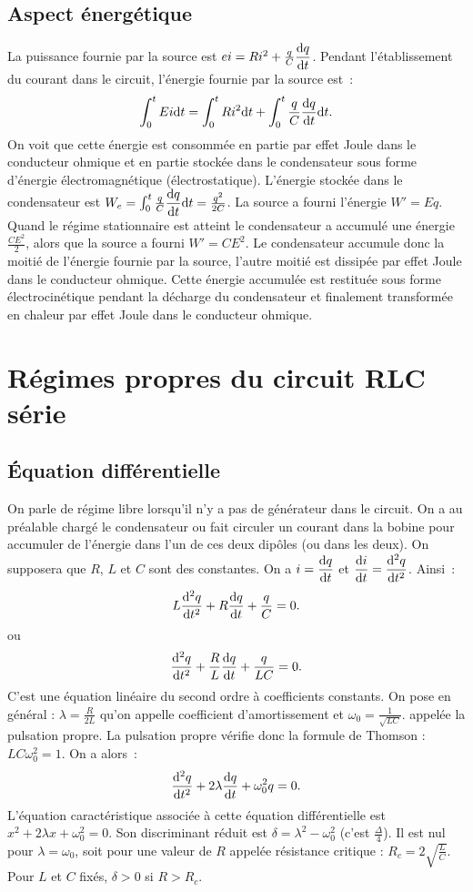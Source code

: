 	\subsection{Aspect énergétique}
		La puissance fournie par la source est $ei = Ri^2 + \frac{q}{C} \dfrac{\mathrm{d} q}{\mathrm{d} t}$. Pendant l'établissement du courant dans le circuit, l'énergie fournie par la source est~:
	\begin{equation}
		\int_0^t Ei \mathrm{d} t = \int_0^t R i^2 \mathrm{d} t + \int_{0}^{t} \frac{q}{C} \dfrac{\mathrm{d} q}{\mathrm{d} t} \mathrm{d} t.
	\end{equation}
		On voit que cette énergie est consommée en partie par effet Joule dans le conducteur ohmique et en partie stockée dans le condensateur sous forme d'énergie électromagnétique (électrostatique). L'énergie stockée dans le condensateur est $W_e = \int_{0}^{t} \frac{q}{C} \dfrac{\mathrm{d} q}{\mathrm{d} t} \mathrm{d} t = \frac{q^2}{2C}$. La source a fourni l'énergie $W' = Eq$. Quand le régime stationnaire est atteint le condensateur a accumulé une énergie $\frac{CE^2}{2}$, alors que la source a fourni $W' = C E^2$. Le condensateur accumule donc la moitié de l'énergie fournie par la source, l'autre moitié est dissipée par effet Joule dans le conducteur ohmique. Cette énergie accumulée est restituée sous forme électrocinétique pendant la décharge du condensateur et finalement transformée en chaleur par effet Joule dans le conducteur ohmique.
\section{Régimes propres du circuit RLC série}
	\subsection{Équation différentielle}
		On parle de régime libre lorsqu’il n’y a pas de générateur dans le circuit. On a au préalable chargé le condensateur ou fait circuler un courant dans la bobine pour accumuler de l’énergie dans l’un de ces deux dipôles (ou dans les deux). On supposera que $R$, $L$ et $C$ sont des constantes. On a $i = \dfrac{\mathrm{d} q}{\mathrm{d} t}$ et $\dfrac{\mathrm{d} i}{\mathrm{d} t} = \dfrac{\mathrm{d}^2 q}{\mathrm{d} {t}^2}$. Ainsi~:
		\begin{equation}
			L \dfrac{\mathrm{d}^2 q}{\mathrm{d} {t}^2} + R \dfrac{\mathrm{d} q}{\mathrm{d} t} + \frac{q}{C} = 0.
		\end{equation}
		ou
		\begin{equation}
			\dfrac{\mathrm{d}^2 q}{\mathrm{d} {t}^2} + \frac{R}{L} \dfrac{\mathrm{d} q}{\mathrm{d} t} + \frac{q}{LC} = 0.
		\end{equation}
		C'est une équation linéaire du second ordre à coefficients constants. On pose en général : $\lambda = \frac{R}{2L}$ qu'on appelle coefficient d'amortissement et $\omega_0 = \frac{1}{\sqrt{LC}}$. appelée la pulsation propre. La pulsation propre vérifie donc la formule de Thomson : $L C \omega_0^2 = 1$. On a alors~:
		\begin{equation}
			\dfrac{\mathrm{d}^2 q}{\mathrm{d} {t}^2} + 2\lambda \dfrac{\mathrm{d} q}{\mathrm{d} t} + \omega_0^2 q = 0.
		\end{equation}
		L'équation caractéristique associée à cette équation différentielle est $x^2 + 2\lambda x + \omega_0^2=0$. 	Son discriminant réduit est $\delta = \lambda^2-\omega_0^2$ (c'est $\frac{\Delta}{4}$). Il est nul pour $\lambda=\omega_0$, soit pour une valeur de $R$ appelée résistance critique : $R_c = 2\sqrt{\frac{L}{C}}$. Pour $L$ et $C$ fixés, $\delta>0$ si $R > R_c$.
